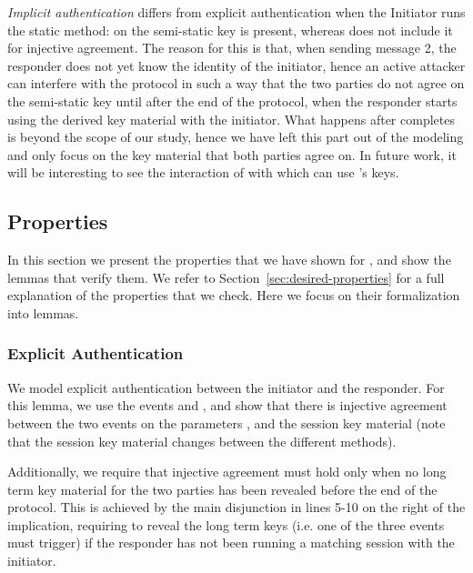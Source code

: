 \emph{Implicit authentication} differs from explicit authentication when the
Initiator runs the static method: on  the semi-static key \mGiy{} is
present, whereas  does not include it for injective agreement.
%
The reason for this is that, when sending message 2, the responder does not yet
know the identity of the initiator, hence an active attacker can interfere with
the protocol in such a way that the two parties do not agree on the semi-static
key \mGiy{} until after the end of the protocol, when the responder starts using
the derived key material with the initiator.
%
What happens after \mEdhoc{} completes is beyond the scope of our study, hence
we have left this part out of the modeling and only focus on the key material
that both parties agree on.
%
In future work, it will be interesting to see the interaction of \mEdhoc{} with
\mOscore{} which can use \mEdhoc{}'s keys.

\spacehack
\subsection{Properties}
\label{sec:properties}
\fillhack{}
In this section we present the properties that we have shown for \mEdhoc, and
show the lemmas that verify them. We refer to
Section~\ref{sec:desired-properties} for a full explanation of the properties
that we check. Here we focus on their formalization into \mTamarin{} lemmas.

\spacehack
\subsubsection{Explicit Authentication}

We model explicit authentication between the initiator and the
responder.
%
For this lemma, we use the events  and
, and show that there is injective agreement
between the two events on the parameters ,
 and the session key material  (note
that the session key material changes between the different \mEdhoc{}
methods).

Additionally, we require that injective agreement must hold only when
no long term key material for the two parties has been revealed before
the end of the protocol.
%
This is achieved by the main disjunction in lines 5-10 on the right of
the implication, requiring to reveal the long term keys (i.e. one of
the three  events must trigger) if the responder has
not been running a matching session with the initiator.

